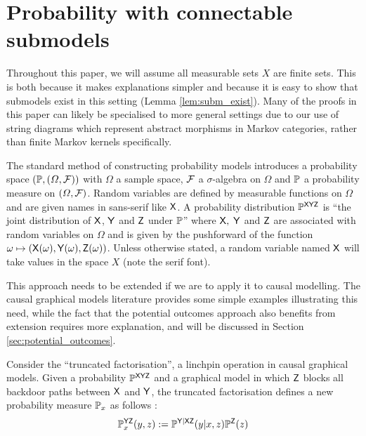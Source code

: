 

\section{Probability with connectable submodels}

Throughout this paper, we will assume all measurable sets $X$ are finite sets. This is both because it makes explanations simpler and because it is easy to show that submodels exist in this setting (Lemma \ref{lem:subm_exist}). Many of the proofs in this paper can likely be specialised to more general settings due to our use of string diagrams which represent abstract morphisms in Markov categories, rather than finite Markov kernels specifically.

The standard method of constructing probability models introduces a probability space $(\mathbb{P},(\Omega,\mathcal{F}))$ with $\Omega$ a sample space, $\mathcal{F}$ a $\sigma$-algebra on $\Omega$ and $\mathbb{P}$ a probability measure on $(\Omega,\mathcal{F})$. Random variables are defined by measurable functions on $\Omega$ and are given names in sans-serif like $\mathsf{X}$. A probability distribution $\mathbb{P}^{\mathsf{XYZ}}$ is ``the joint distribution of $\mathsf{X}$, $\mathsf{Y}$ and $\mathsf{Z}$ under $\mathbb{P}$'' where $\mathsf{X},$ $\mathsf{Y}$ and $\mathsf{Z}$ are associated with random variables on $\Omega$ and is given by the pushforward of the function $\omega\mapsto (\mathsf{X}(\omega),\mathsf{Y}(\omega),\mathsf{Z}(\omega))$. Unless otherwise stated, a random variable named $\mathsf{X}$ will take values in the space $X$ (note the serif font).

This approach needs to be extended if we are to apply it to causal modelling. The causal graphical models literature provides some simple examples illustrating this need, while the fact that the potential outcomes approach also benefits from extension requires more explanation, and will be discussed in Section \ref{sec:potential_outcomes}. 

Consider the ``truncated factorisation'', a linchpin operation in causal graphical models. Given a probability $\mathbb{P}^{\mathsf{XYZ}}$ and a graphical model in which $\mathsf{Z}$ blocks all backdoor paths between $\mathsf{X}$ and $\mathsf{Y}$, the truncated factorisation defines a new probability measure $\mathbb{P}_x$ as follows \citep[page ~24]{pearl_causality:_2009}:
\begin{align}
	\mathbb{P}^{\mathsf{YZ}}_{x}(y,z):=\mathbb{P}^{\mathsf{Y|XZ}}(y|x,z)\mathbb{P}^{\mathsf{Z}}(z)\label{eq:truncated_fac}
\end{align}

